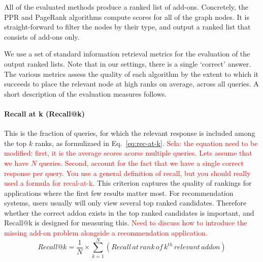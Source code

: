 \documentclass[11pt,oneside]{book}
\begin{document}

All of the evaluated methods produce a ranked list of add-ons. 
Concretely, the PPR and PageRank algorithms compute scores for all of the graph nodes.
It is straight-forward to filter the nodes by their type, and output a ranked list that consists of add-ons only.

We use a set of standard information retrieval metrics for the evaluation of the output ranked lists. Note that in our settings, there is a single `correct' answer. The various metrics assess the quality of each algorithm by the extent to which it succeeds to 
place the relevant node at high ranks on average, across all queries. A short description of the evaluation measures follows.

\paragraph{Recall at k (Recall@k)}
This is the fraction of queries, for which the relevant response is included among the top $k$ ranks, as formulizaed in Eq.~\eqref{eq:rec-at-k}. \textcolor{red}{Sela: the equation need to be modified: first, it is the average scores acorss multiple queries. Lets assume that we have $N$ queries. Second, account for the fact that we have a single correct response per query. You use a general definition of recall, but you should really used a formula for recal-at-k}. This criterion captures the quality of rankings for applications where the first few results matter most. 
For recommendation systems, users usually will only view several top ranked candidates. Therefore
whether the correct addon exists in the top ranked candidates is
important, and Recall@k is designed for measuring this. \textcolor{red}{Need to discuss how to introduce the missing add-on problem alongside a recommendation application.}
\begin{equation}
 Recall@k = \frac{1}{N} \times \displaystyle\sum\limits_{k=1}^{N} (Recall \, at \, rank \, of \, k^{th} \, relevant \, addon)
\label{eq:rec-at-k}
\end{equation}
\end{document}
